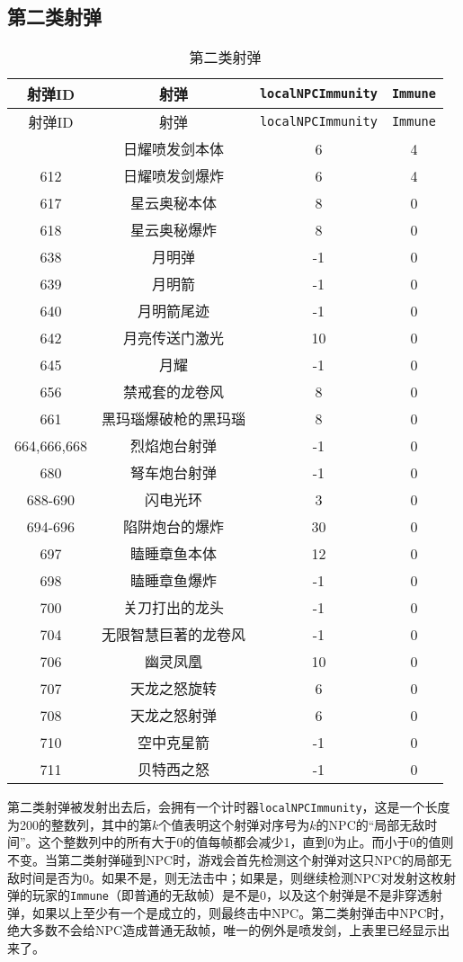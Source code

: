 \subsection{第二类射弹}\label{sec26}
\begin{longtable}{|c|c|c|c|}
\caption{第二类射弹}\\ \hline
射弹ID & 射弹 & {\lstinline!localNPCImmunity!} & {\lstinline!Immune!}\\\hline
\endfirsthead
\hline 射弹ID & 射弹 & {\lstinline!localNPCImmunity!} & {\lstinline!Immune!}\\\hline
\endhead
\hline
\endfoot
611 & 日耀喷发剑本体 & 6 & 4 \\ \hline
612 & 日耀喷发剑爆炸 & 6 & 4 \\ \hline
617 & 星云奥秘本体 & 8 & 0 \\ \hline
618 & 星云奥秘爆炸 & 8 & 0 \\ \hline
638 & 月明弹 & -1 & 0 \\ \hline
639 & 月明箭 & -1 & 0 \\ \hline
640 & 月明箭尾迹 & -1 & 0 \\ \hline
642 & 月亮传送门激光 & 10 & 0 \\ \hline
645 & 月耀 & -1 & 0 \\ \hline
656 & 禁戒套的龙卷风 & 8 & 0 \\ \hline
661 & 黑玛瑙爆破枪的黑玛瑙 & 8 & 0 \\ \hline
664,666,668 & 烈焰炮台射弹 & -1 & 0 \\ \hline
680 & 弩车炮台射弹 & -1 & 0 \\ \hline
688-690 & 闪电光环 & 3 & 0 \\ \hline
694-696 & 陷阱炮台的爆炸 & 30 & 0 \\ \hline
697 & 瞌睡章鱼本体 & 12 & 0 \\ \hline
698 & 瞌睡章鱼爆炸 & -1 & 0 \\ \hline
700 & 关刀打出的龙头 & -1 & 0 \\ \hline
704 & 无限智慧巨著的龙卷风 & -1 & 0 \\ \hline
706 & 幽灵凤凰 & 10 & 0 \\ \hline
707 & 天龙之怒旋转 & 6 & 0 \\ \hline
708 & 天龙之怒射弹 & 6 & 0 \\ \hline
710 & 空中克星箭 & -1 & 0 \\ \hline
711 & 贝特西之怒 & -1 & 0
\end{longtable}

第二类射弹被发射出去后，会拥有一个计时器\lstinline{localNPCImmunity}，这是一个长度为200的整数列，其中的第$k$个值表明这个射弹对序号为$k$的NPC的“局部无敌时间”。这个整数列中的所有大于0的值每帧都会减少1，直到0为止。而小于0的值则不变。当第二类射弹碰到NPC时，游戏会首先检测这个射弹对这只NPC的局部无敌时间是否为0。如果不是，则无法击中；如果是，则继续检测NPC对发射这枚射弹的玩家的\lstinline{Immune}（即普通的无敌帧）是不是0，以及这个射弹是不是非穿透射弹，如果以上至少有一个是成立的，则最终击中NPC。第二类射弹击中NPC时，绝大多数不会给NPC造成普通无敌帧，唯一的例外是喷发剑，上表里已经显示出来了。

